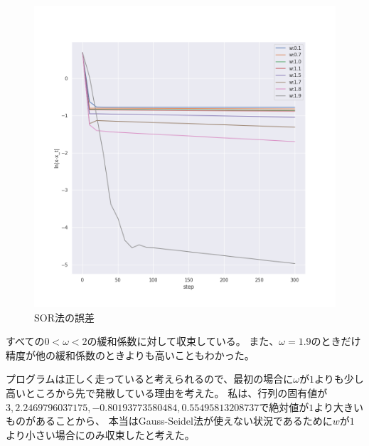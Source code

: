 \documentclass{jsarticle}
\begin{document}
\begin{figure}[htbp]
    \includegraphics[clip,width=15.0cm]{./sor_debug.png}
    \caption{SOR法の誤差}
\end{figure}


すべての$0<\omega<2$の緩和係数に対して収束している。
また、$\omega = 1.9$のときだけ精度が他の緩和係数のときよりも高いこともわかった。

プログラムは正しく走っていると考えられるので、最初の場合に$\omega$が$1$よりも少し高いところから先で発散している理由を考えた。
私は、行列の固有値が$3,	2.2469796037175,	-0.80193773580484,	0.55495813208737$で絶対値が$1$より大きいものがあることから、
本当はGauss-Seidel法が使えない状況であるために$w$が$1$より小さい場合にのみ収束したと考えた。
\end{document}
